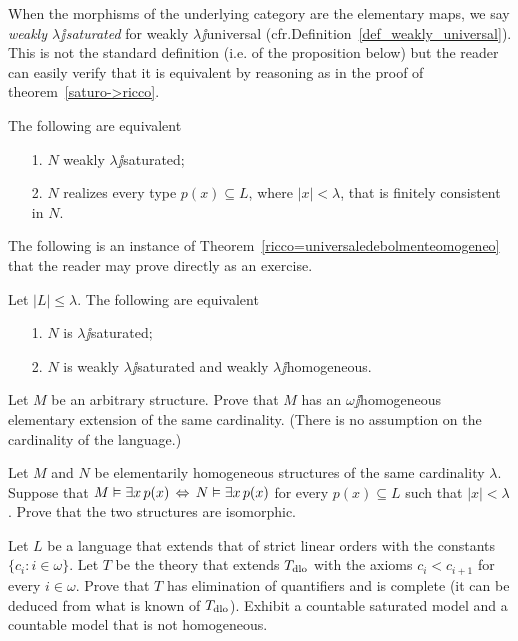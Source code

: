 \documentclass[creche.tex]{subfiles}
\begin{document}
When the morphisms of the underlying category are the elementary maps, we say \emph{weakly $\lambda\jj$saturated} for weakly $\lambda\jj$universal (cfr.\@ Definition~\ref{def_weakly_universal}). This is not the standard definition (i.e.\@ {} of the proposition below) but the reader can easily verify that it is equivalent by reasoning as in the proof of theorem~\ref{saturo->ricco}.

\begin{proposition}\label{prop_w_saturation}
The following are equivalent
\begin{itemize}
\item[1.] $N$ weakly $\lambda\jj$saturated;
\item[2.] $N$ realizes every type $p(x)\subseteq L$, where $|x|<\lambda$, that is finitely consistent in $N$.\QED
\end{itemize}
\end{proposition}

The following is an instance of Theorem~\ref{ricco=universaledebolmenteomogeneo} that the reader may prove directly as an exercise.

\begin{corollary}\label{saturo=universaledebolmenteomogeneo}
Let $|L|\le\lambda$. The following are equivalent\nobreak
\begin{itemize}
\item[1.] $N$ is $\lambda\jj$saturated;
\item[2.] $N$ is weakly $\lambda\jj$saturated and weakly $\lambda\jj$homogeneous.\QED
\end{itemize}
\end{corollary}


\begin{exercise}\label{ex_omega_homogeneous_same_card}
Let $M$ be an arbitrary structure. Prove that $M$ has an $\omega\jj$homogeneous elementary extension of the same cardinality. (There is no assumption on the cardinality of the language.)\QED 
\end{exercise}

\begin{exercise}
Let $M$ and $N$ be elementarily homogeneous structures of the same cardinality $\lambda$. Suppose that $M\vDash\exists x\, p(x)\,\Leftrightarrow\,N\vDash\exists x\, p(x)$ for every $p(x)\subseteq L$ such that $|x|<\lambda$. Prove that the two structures are isomorphic.\QED 
\end{exercise}

\begin{exercise}\label{vaughtesempio}
Let $L$ be a language that extends that of strict linear orders with the constants $\{c_i: i\in\omega\}$. Let $T$ be the theory that extends $T_{\rm dlo}$ with the axioms $c_i<c_{i+1}$ for every  $i\in\omega$. Prove that $T$ has elimination of quantifiers and is complete (it can be deduced from what is known of $T_{\rm dlo}$). Exhibit a countable saturated model and a countable model that is not homogeneous.\QED 
\end{exercise}
\end{document}
